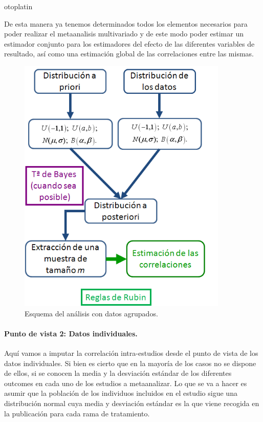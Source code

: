 otoplatin\documentclass[a4paper,openright,12pt]{report}
\begin{document}
De esta manera ya tenemos determinados todos los elementos necesarios para poder realizar el metaanalisis multivariado y de este modo poder estimar un estimador conjunto para los estimadores del efecto de las diferentes variables de resultado, así como una estimación global de las correlaciones entre las mismas.

\medskip 
\begin{figure}[htb]
\begin{center}
\includegraphics[width=10cm]{Perspectiva1}
\caption{Esquema del análisis con datos agrupados.}
\label{Perspectiva1}
\end{center}
\end{figure}

\paragraph{Punto de vista 2: Datos individuales.}
Aquí vamos a imputar la correlación intra-estudios desde el punto de vista de los datos individuales. Si bien es cierto que en la mayoría de los casos no se dispone de ellos, si se conocen la media y la desviación estándar de los diferentes outcomes en cada uno de los estudios a metaanalizar. Lo que se va a hacer es asumir que la población de los individuos incluidos en el estudio sigue una distribución normal cuya media y desviación estándar es la que viene recogida en la publicación para cada rama de tratamiento.
\end{document}
